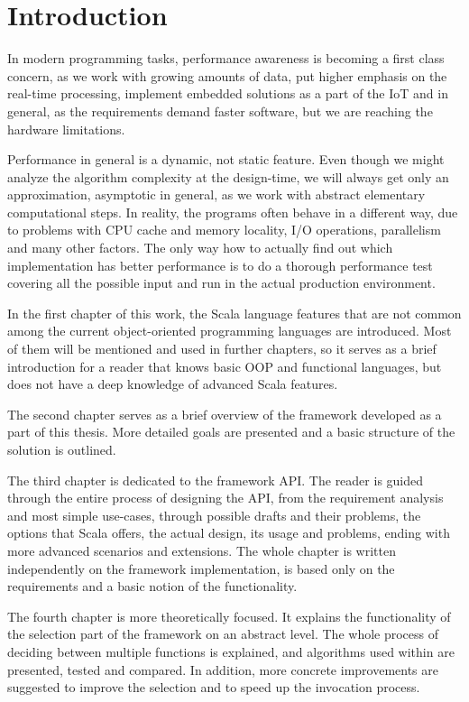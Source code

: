 \chapter*{Introduction}

In modern programming tasks, performance awareness is becoming a first class concern, as we work with growing amounts of data, put higher emphasis on the real-time processing, implement embedded solutions as a part of the IoT and in general, as the requirements demand faster software, but we are reaching the hardware limitations. 

Performance in general is a dynamic, not static feature. Even though we might analyze the algorithm complexity at the design-time, we will always get only an approximation, asymptotic in general, as we work with abstract elementary computational steps. In reality, the programs often behave in a different way, due to problems with CPU cache and memory locality, I/O operations, parallelism and many other factors. The only way how to actually find out which implementation has better performance is to do a thorough performance test covering all the possible input and run in the actual production environment.


 


In the first chapter of this work, the Scala language features that are not common among the current object-oriented programming languages are introduced. Most of them will be mentioned and used in further chapters, so it serves as a brief introduction for a reader that knows basic OOP and functional languages, but does not have a deep knowledge of advanced Scala features.

The second chapter serves as a brief overview of the framework developed as a part of this thesis. More detailed goals are presented and a basic structure of the solution is outlined.

The third chapter is dedicated to the framework API. The reader is guided through the entire process of designing the API, from the requirement analysis and most simple use-cases, through possible drafts and their problems, the options that Scala offers, the actual design, its usage and problems, ending with more advanced scenarios and extensions. The whole chapter is written independently on the framework implementation, is based only on the requirements and a basic notion of the functionality.

The fourth chapter is more theoretically focused. It explains the functionality of the selection part of the framework on an abstract level. The whole process of deciding between multiple functions is explained, and algorithms used within are presented, tested and compared. In addition, more concrete improvements are suggested to improve the selection and to speed up the invocation process.

